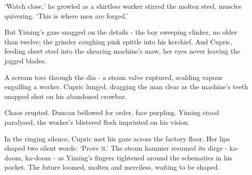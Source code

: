 `Watch close,' he growled as a shirtless worker stirred the molten steel, muscles quivering. `This is where men are forged.'

But Yiming's gaze snagged on the details - the boy sweeping clinker, no older than twelve; the grinder coughing pink spittle into his kerchief. And Cupric, feeding sheet steel into the shearing machine's maw, her eyes never leaving the jagged blades.

A scream tore through the din - a steam valve ruptured, scalding vapour engulfing a worker. Cupric lunged, dragging the man clear as the machine's teeth snapped shut on his abandoned crowbar.

Chaos erupted. Duncan bellowed for order, face purpling. Yiming stood paralysed, the worker's blistered flesh imprinted on his vision.

In the ringing silence, Cupric met his gaze across the factory floor. Her lips shaped two silent words: `Prove it.'
The steam hammer resumed its dirge - ka-doom, ka-doom - as Yiming's fingers tightened around the schematics in his pocket. The future loomed, molten and merciless, waiting to be shaped.